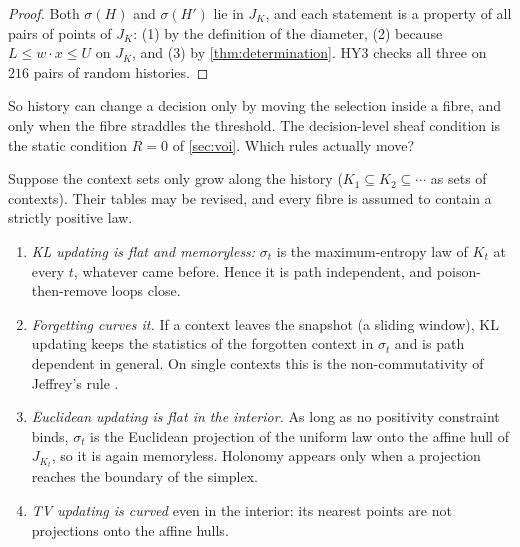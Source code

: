 \documentclass[11pt]{article}
\theoremstyle{definition}\newtheorem{definition}[theorem]{Definition}\newtheorem{remark}[theorem]{Remark}\newtheorem{example}[theorem]{Example}\newtheorem{problem}[theorem]{Open problem}\crefname{problem}{Problem}{Problems}
\begin{document}
\begin{proof}
Both $\sigma(H)$ and $\sigma(H')$ lie in $J_K$, and each statement is a property of all pairs of points of $J_K$: (1) by the definition of the diameter, (2) because $L\le w\cdot x\le U$ on $J_K$, and (3) by \cref{thm:determination}. HY3 checks all three on $216$ pairs of random histories.
\end{proof}

So history can change a decision only by moving the selection inside a fibre, and only when the fibre straddles the threshold. The decision-level sheaf condition is the static condition $R=0$ of \cref{sec:voi}. Which rules actually move?

\begin{proposition}\label{prop:flat}
Suppose the context sets only grow along the history ($K_1\subseteq K_2\subseteq\cdots$ as sets of contexts). Their tables may be revised, and every fibre is assumed to contain a strictly positive law.
\begin{enumerate}
\item[(1)] \emph{KL updating is flat and memoryless:} $\sigma_t$ is the maximum-entropy law of $K_t$ at every $t$, whatever came before. Hence it is path independent, and poison-then-remove loops close.
\item[(2)] \emph{Forgetting curves it.} If a context leaves the snapshot (a sliding window), KL updating keeps the statistics of the forgotten context in $\sigma_t$ and is path dependent in general. On single contexts this is the non-commutativity of Jeffrey's rule \cite{DiaconisZabell1982}.
\item[(3)] \emph{Euclidean updating is flat in the interior.} As long as no positivity constraint binds, $\sigma_t$ is the Euclidean projection of the uniform law onto the affine hull of $J_{K_t}$, so it is again memoryless. Holonomy appears only when a projection reaches the boundary of the simplex.
\item[(4)] \emph{TV updating is curved} even in the interior: its nearest points are not projections onto the affine hulls.
\end{enumerate}
\end{proposition}
\end{document}
